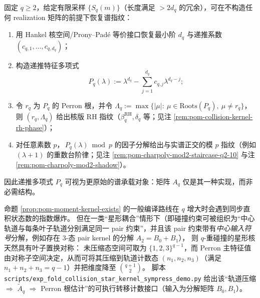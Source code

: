 \begin{algorithm}\label{alg:pom-recurrence-polynomial-spectral-extraction}
固定 \(q\ge 2\)，给定有限采样 \(\{S_q(m)\}\)（长度满足 \(>\!2d_q\) 的冗余），可在不构造任何 realization 矩阵的前提下恢复谱指纹：
\begin{enumerate}
  \item 用 Hankel 核空间/Prony--Pad\'e 等价接口恢复最小阶 \(d_q\) 与递推系数 \((c_{q,1},\dots,c_{q,d_q})\)；
  \item 构造递推特征多项式
  \[
  P_q(\lambda):=\lambda^{d_q}-\sum_{j=1}^{d_q}c_{q,j}\lambda^{d_q-j};
  \]
  \item 令 \(r_q\) 为 \(P_q\) 的 Perron 根，并令
  \(
  \Lambda_q:=\max\{|\mu|:\ \mu\in\mathrm{Roots}(P_q),\ \mu\ne r_q\}
  \)，则 \((r_q,\Lambda_q)\) 给出核版 RH 指纹（\(\beta^{\mathrm{RH}}_q,\delta_q\) 等；见注 \ref{rem:pom-collision-kernel-rh-phase}）；
  \item 对任意素数 \(p\)，\(\,P_q(\lambda)\bmod p\) 的因子分解给出与实谱正交的模 \(p\) 指纹（例如 \((\lambda+1)\) 的重数台阶律；见注 \ref{rem:pom-charpoly-mod2-staircase-q2-10} 与注 \ref{rem:pom-charpoly-mod2-shadow}）。
\end{enumerate}
因此递推多项式 \(P_q\) 可视为更原始的谱承载对象：矩阵 \(A_q\) 仅是其一种实现，而非必需结构。
\end{algorithm}

\begin{remark}\label{rem:pom-star-sympress}
命题 \ref{prop:pom-moment-kernel-exists} 的一般编译路线在 \(q\) 增大时会遇到同步直积状态数的指数爆炸。
但在一类“星形耦合”情形下（即碰撞约束可被组织为“中心轨道与每条叶子轨道分别满足同一 pair 约束”，并且该 pair 约束带有\emph{中心输入符号}分解，例如存在 \(3\)-态 pair kernel 的分解 \(A_2=B_0+B_1\)），
则 \(q\)-重碰撞的星形核天然具有叶子置换对称：
未压缩态空间可取为 \(\{1,2,3\}^{q-1}\)，而 Perron 主特征值由对称子空间决定，从而可将其压缩到轨道计数态
\((n_1,n_2,n_3)\)（满足 \(n_1+n_2+n_3=q-1\)）并把维度降至
\(\binom{q+1}{2}\)。
脚本 \texttt{scripts/exp\_fold\_collision\_star\_kernel\_sympress\_demo.py} 给出该“轨道压缩 \(\Rightarrow\) \(\widetilde A_q\) \(\Rightarrow\) Perron 根估计”的可执行转移计数接口（输入为分解矩阵 \(B_0,B_1\)）。
\end{remark}

